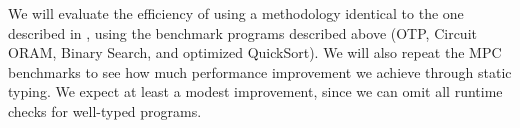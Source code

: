 We will evaluate the efficiency of \lang using a methodology identical to the one described in , using the
benchmark programs described above (OTP, Circuit ORAM, Binary Search, and optimized QuickSort). We will also repeat the MPC
benchmarks to see how much performance improvement we achieve through static typing. We expect at least a modest improvement,
since we can omit all runtime checks for well-typed programs.
